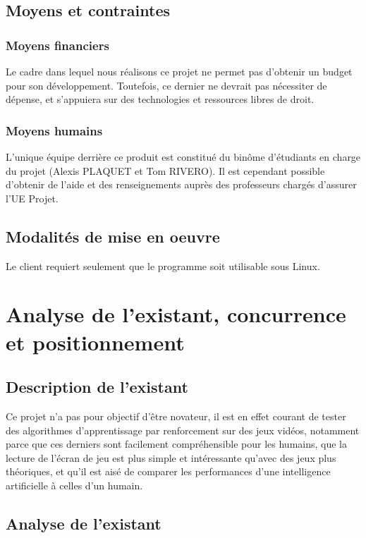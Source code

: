 \section{Moyens et contraintes}
\subsection{Moyens financiers}
Le cadre dans lequel nous réalisons ce projet ne permet pas d’obtenir un budget pour son développement. Toutefois, ce dernier ne devrait pas nécessiter de dépense, et s’appuiera sur des technologies et ressources libres de droit.

\subsection{Moyens humains}
L’unique équipe derrière ce produit est constitué du binôme d’étudiants en charge du projet (Alexis PLAQUET et Tom RIVERO). Il est cependant possible d’obtenir de l’aide et des renseignements auprès des professeurs chargés d’assurer l’UE Projet.

\section{Modalités de mise en oeuvre}
Le client requiert seulement que le programme soit utilisable sous Linux.



\chapter{Analyse de l’existant, concurrence et positionnement}

\section{Description de l’existant}
Ce projet n’a pas pour objectif d’être novateur, il est en effet courant de tester des algorithmes d’apprentissage par renforcement sur des jeux vidéos, notamment parce que ces derniers sont facilement compréhensible pour les humains, que la lecture de l’écran de jeu est plus simple et intéressante qu’avec des jeux plus théoriques, et qu’il est aisé de comparer les performances d’une intelligence artificielle à celles d’un humain.

\section{Analyse de l’existant}
